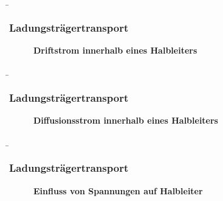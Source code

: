 \begin{frame}
    \b{
    \frametitle{Ladungsträgertransport}
    \begin{figure}[H]
        \centering
        
        \caption{\textbf{Driftstrom innerhalb eines Halbleiters}}  
    \end{figure}
    }

\end{frame}

\begin{frame}
    \b{
    \frametitle{Ladungsträgertransport}
    \begin{figure}[H]
        \centering
        
        \caption{\textbf{Diffusionsstrom innerhalb eines Halbleiters}}  
    \end{figure}
    }

\end{frame}

\begin{frame}
    \b{
    \frametitle{Ladungsträgertransport}
    \begin{figure}[H]
        \centering
        
        \caption{\textbf{Einfluss von Spannungen auf Halbleiter}}  
    \end{figure}
    }

\end{frame}

